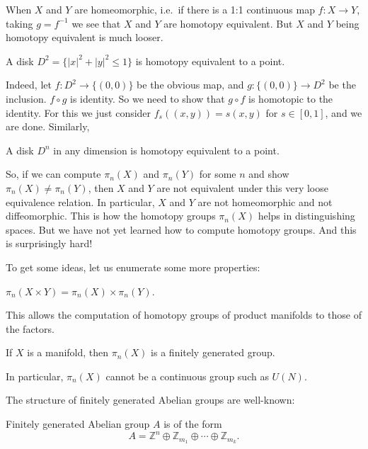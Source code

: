 \documentclass[12pt]{article}
\numberwithin{equation}{section}
\numberwithin{figure}{section}
\theoremstyle{remark}
\def\bZ{\mathbb{Z}}
\begin{document}

When $X$ and $Y$ are homeomorphic, i.e.~if there is a 1:1 continuous map $f:X\to Y$,
taking $g=f^{-1}$ we see that $X$ and $Y$ are homotopy equivalent.
But $X$ and $Y$ being homotopy equivalent is much looser.
\begin{example}
A disk $D^2=\{|x|^2+|y|^2\le 1\}$ is homotopy equivalent to a point.
\end{example}
Indeed, let $f:D^2 \to \{(0,0)\}$ be the obvious map,
and $g:\{(0,0)\}\to D^2$ be the inclusion.
$f\circ g$ is identity.
So we need to show that $g\circ f$ is homotopic to the identity.
For this we just consider $f_s((x,y))= s(x,y)$ for $s\in [0,1]$,
and we are done.
Similarly,
\begin{example}
A disk $D^n$ in any dimension is homotopy equivalent to a point.
\end{example}

So, if we can compute $\pi_n(X)$ and $\pi_n(Y)$ for some $n$ and show $\pi_n(X)\neq \pi_n(Y)$, 
then $X$ and $Y$ are not equivalent under this very loose equivalence relation.
In particular, $X$ and $Y$ are not homeomorphic and not diffeomorphic. 
This is how the homotopy groups $\pi_n(X)$ helps in distinguishing spaces.
But we have not yet learned how to compute homotopy groups.
And this is surprisingly hard!

To get some ideas, let us enumerate some more properties:

\begin{proposition}
  $\pi_n(X\times Y) = \pi_n(X) \times \pi_n(Y)$.
\end{proposition}
This allows the computation of homotopy groups of product manifolds 
to those of the factors.

\begin{proposition}
If $X$ is a manifold, then $\pi_n(X)$ is a finitely generated group.
\end{proposition}
In particular, $\pi_n(X)$ cannot be a continuous group such as $U(N)$.

The structure of finitely generated Abelian groups are well-known:
\begin{fact}
Finitely generated Abelian group $A$ is of the form \begin{equation}
A=\bZ^n \oplus \bZ_{m_1} \oplus \cdots \oplus \bZ_{m_k}.
\label{eq:fin-gen-Abelian}
\end{equation}
\end{fact}
\end{document}
